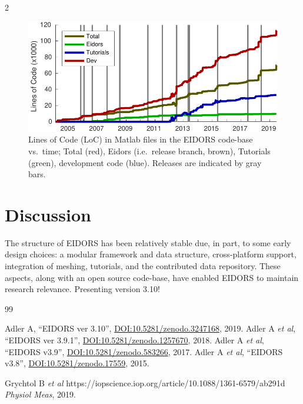 \documentclass[10pt,letterpaper]{article}
\renewenvironment{thebibliography}[1]{%
    \begin{oldthebibliography}{#1}%
      \setlength{\parskip}{0ex}%
      \setlength{\itemsep}{0ex}%
  }%
  {%
    \end{oldthebibliography}%
  }
\begin{document}
\begin{multicols}{2}
\begin{figure}[H]
  \vspace{-2.5mm}
\centering
 \includegraphics[width=.96\columnwidth]{fig_loc.pdf}
\caption{\label{fig:loc}%
  Lines of Code (LoC) in Matlab files in the EIDORS code-base vs.\ time; Total
   (red), Eidors (i.e.\ release branch, brown), Tutorials (green), development code (blue).
   Releases are indicated by gray bars.
}
\end{figure}

\section{Discussion}
The structure of EIDORS has been relatively stable due, in part, to some early design choices:
a modular framework and data structure,
cross-platform support, integration of meshing,
tutorials, and the contributed data repository.
These aspects, along with an open source code-base, have enabled EIDORS to
maintain research relevance.
Presenting version 3.10!



\footnotesize
\begin{thebibliography}{99}
   Adler A, ``EIDORS ver 3.10'',
   \href{http://dx.doi.org/10.5281/zenodo.3247168}{DOI:10.5281/zenodo.3247168},
    2019.
   Adler A {\em et al}, ``EIDORS ver 3.9.1'',
   \href{http://dx.doi.org/10.5281/zenodo.1257670}{DOI:10.5281/zenodo.1257670},
    2018.
   Adler A {\em et al}, ``EIDORS v3.9'',
   \href{http://dx.doi.org/10.5281/zenodo.583266}{DOI:10.5281/zenodo.583266},
    2017.
   Adler A {\em et al}, ``EIDORS v3.8'',
   \href{http://dx.doi.org/10.5281/zenodo.17559}{DOI:10.5281/zenodo.17559},
    2015.

   Grychtol B {\em et al}
   https://iopscience.iop.org/article/10.1088/1361-6579/ab291d   
   {\em Physiol Meas}, 2019.




\end{thebibliography}
\end{multicols}
\end{document}
